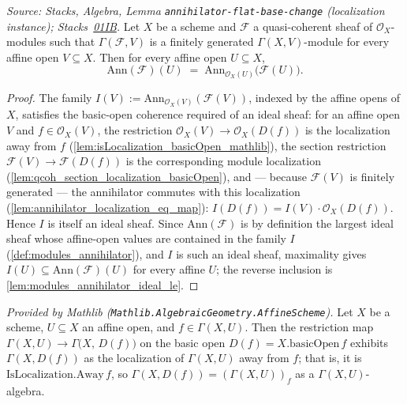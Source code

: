 \begin{lemma}
  \label{lem:modules_annihilator_ideal}
  \textit{Source: Stacks, Algebra, Lemma \texttt{annihilator-flat-base-change}
  (localization instance);
  Stacks~\href{https://stacks.math.columbia.edu/tag/01IB}{01IB}.}
  Let \(X\) be a scheme and \(\mathcal{F}\) a quasi-coherent sheaf of
  \(\mathcal{O}_X\)-modules such that \(\Gamma(\mathcal{F}, V)\) is a finitely
  generated \(\Gamma(X, V)\)-module for every affine open \(V \subseteq X\).
  Then for every affine open \(U \subseteq X\),
  \[
    \mathrm{Ann}(\mathcal{F})(U)
    \;=\; \mathrm{Ann}_{\mathcal{O}_X(U)}\bigl(\mathcal{F}(U)\bigr).
  \]
\end{lemma}
\begin{proof}\leanok
  The family \(I(V) := \mathrm{Ann}_{\mathcal{O}_X(V)}(\mathcal{F}(V))\),
  indexed by the affine opens of \(X\), satisfies the basic-open coherence
  required of an ideal sheaf: for an affine open \(V\) and
  \(f \in \mathcal{O}_X(V)\), the restriction
  \(\mathcal{O}_X(V) \to \mathcal{O}_X(D(f))\) is the localization away from
  \(f\) (\cref{lem:isLocalization_basicOpen_mathlib}), the section restriction
  \(\mathcal{F}(V) \to \mathcal{F}(D(f))\) is the corresponding module
  localization (\cref{lem:qcoh_section_localization_basicOpen}), and — because
  \(\mathcal{F}(V)\) is finitely generated — the annihilator commutes with this
  localization (\cref{lem:annihilator_localization_eq_map}):
  \(I(D(f)) = I(V) \cdot \mathcal{O}_X(D(f))\).  Hence \(I\) is itself an
  ideal sheaf.  Since \(\mathrm{Ann}(\mathcal{F})\) is by definition the
  largest ideal sheaf whose affine-open values are contained in the family
  \(I\) (\cref{def:modules_annihilator}), and \(I\) is such an ideal sheaf,
  maximality gives \(I(U) \subseteq \mathrm{Ann}(\mathcal{F})(U)\) for every
  affine \(U\); the reverse inclusion is
  \cref{lem:modules_annihilator_ideal_le}.
\end{proof}


\begin{lemma}
  \label{lem:isLocalization_basicOpen_mathlib}
  \mathlibok
  \textit{Provided by Mathlib
  (\texttt{Mathlib.AlgebraicGeometry.AffineScheme}).}
  Let \(X\) be a scheme, \(U \subseteq X\) an affine open, and
  \(f \in \Gamma(X, U)\). Then the restriction map
  \(\Gamma(X, U) \to \Gamma\bigl(X,\, D(f)\bigr)\) on the basic open
  \(D(f) = X.\mathrm{basicOpen}\,f\) exhibits \(\Gamma(X, D(f))\) as the
  localization of \(\Gamma(X, U)\) away from \(f\); that is, it is
  \(\mathrm{IsLocalization.Away}\,f\), so
  \(\Gamma(X, D(f)) = (\Gamma(X, U))_f\) as a \(\Gamma(X,U)\)-algebra.
\end{lemma}


